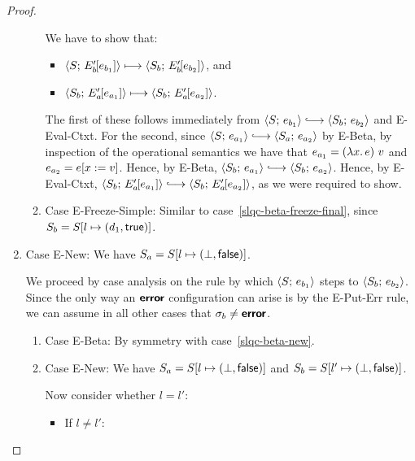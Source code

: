 \begin{proof}
\begin{enumerate}
\begin{enumerate}
      We have to show that:
      \begin{itemize}
      \item $\langle S;\, E'_b\hspace{-1mm}\left[e_{b_1}\right] \rangle \longmapsto
        \langle S_b;\, E'_b\hspace{-1mm}\left[e_{b_2}\right] \rangle$, and
      \item
        $\langle S_b;\, E'_a\hspace{-1mm}\left[e_{a_1}\right] \rangle \longmapsto
        \langle S_b;\, E'_a\hspace{-1mm}\left[e_{a_2}\right] \rangle$.
      \end{itemize}

      The first of these follows immediately from $\config{S}{e_{b_1}}
      \parstepsto \config{S_b}{e_{b_2}}$ and {\sc E-Eval-Ctxt}.  For
      the second, since $\config{S}{e_{a_1}} \parstepsto
      \config{S_a}{e_{a_2}}$ by {\sc E-Beta}, by inspection of the
      operational semantics we have that $e_{a_1} =
      (\lambda x.\,e)~v$ and $e_{a_2} = e[x := v]$.  Hence,
      by {\sc E-Beta}, $\config{S_b}{e_{a_1}} \parstepsto
      \config{S_b}{e_{a_2}}$.  Hence, by {\sc E-Eval-Ctxt},
      $\config{S_b}{\evalctxt{E'_a}{e_{a_1}}} \parstepsto
      \config{S_b}{\evalctxt{E'_a}{e_{a_2}}}$, as we were required to
      show.


    \item \label{slqc-beta-freeze-simple}Case {\sc E-Freeze-Simple}:
      Similar to case~\ref{slqc-beta-freeze-final}, since $S_b =
      S[l \mapsto (d_1, \textsf{true})]$.

    \end{enumerate}
  \item Case {\sc E-New}: We have $S_a = S[l \mapsto (\bot, \textsf{false})]$.

    We proceed by case analysis on the rule by which
    $\langle S;\, e_{b_1} \rangle$ steps to $\langle S_b;\, e_{b_2} \rangle$.  Since the
    only way an $\textbf{\textsf{error}}$ configuration can arise is by the {\sc
      E-Put-Err} rule, we can assume in all other cases that $\sigma_b
    \neq \textbf{\textsf{error}}$.
    \begin{enumerate}
    \item \label{slqc-new-beta}Case {\sc E-Beta}: By symmetry with case~\ref{slqc-beta-new}.
    \item \label{slqc-new-new}Case {\sc E-New}: We have $S_a =
      S[l \mapsto (\bot, \textsf{false})]$ and $S_b =
      S[l' \mapsto (\bot, \textsf{false})]$.

      Now consider whether $l = l'$:
      \begin{itemize}
        \item If $l \neq l'$:


\end{itemize}
\end{enumerate}
\end{enumerate}
\end{proof}

